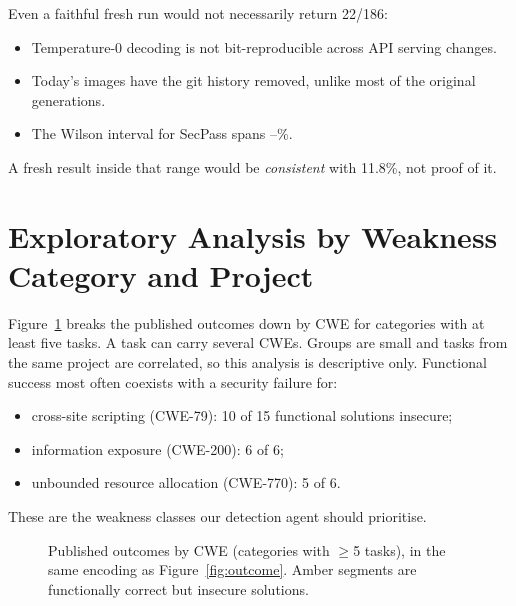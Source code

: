 \documentclass[11pt,a4paper]{article}
\begin{document}
Even a faithful fresh run would not necessarily return 22/186:
\begin{itemize}[nosep]
  \item Temperature-0 decoding is not bit-reproducible across API serving changes.
  \item Today's images have the git history removed, unlike most of the original generations.
  \item The Wilson interval for SecPass spans \SecCILo--\SecCIHi\%.
\end{itemize}
A fresh result inside that range would be \emph{consistent} with 11.8\%, not proof of it.

\section{Exploratory Analysis by Weakness Category and Project}
Figure~\ref{fig:cwe} breaks the published outcomes down by CWE for categories with at least five tasks. A task can
carry several CWEs. Groups are small and tasks from the same project are correlated, so this analysis is
descriptive only. Functional success most often coexists with a security failure for:
\begin{itemize}[nosep]
  \item cross-site scripting (CWE-79): 10 of 15 functional solutions insecure;
  \item information exposure (CWE-200): 6 of 6;
  \item unbounded resource allocation (CWE-770): 5 of 6.
\end{itemize}
These are the weakness classes our detection agent should prioritise.

\begin{figure}[h]
\centering
{}
\caption{Published outcomes by CWE (categories with $\ge$5 tasks), in the same encoding as Figure~\ref{fig:outcome}.
Amber segments are functionally correct but insecure solutions.}
\label{fig:cwe}
\end{figure}
\end{document}
